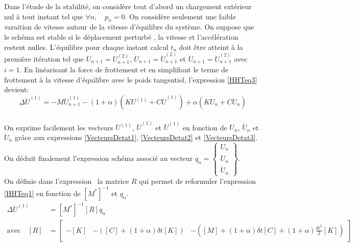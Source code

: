 \documentclass[11pt, a4paper]{article}
\begin{document}
Dans l'étude de la stabilité, on considère tout d'abord un chargement extérieur nul à tout instant tel que $\forall n, \quad p_n = {0}$. On considère seulement une faible varaition de vitesse autour de la vitesse d'équilibre du système. On suppose que le schéma est stable si le déplacement perturbé , la vitesse et l'accélération restent nulles. L'équilibre pour chaque instant calcul $t_n$ doit être atteint à la première itération tel que $U_{n+1} = U_{n+1}^{(2)}$, $\dot{U}_{n+1} = \dot{U}_{n+1}^{(2)}$ et $\ddot{U}_{n+1} = \ddot{U}_{n+1}^{(2)}$ avec $i=1$. En linéarisant la force de frottement et en simplifiant le terme de frottement à la vitesse d'équilibre avec le poids tangentiel, l'expression \ref{HHTeq3} devient:
$$ \Delta \ddot{U}^{(1)} = - M \ddot{U}_{n+1}^{(1)} -(1+\alpha) \left( K U^{(1)} + C \dot{U}^{(1)} \right) + \alpha \left( K U_{n} + C \dot{U}_{n} \right) $$
\\ On exprime facilement les vecteurs $U^{(1)}$, $\dot{U}^{(1)}$ et $\ddot{U}^{(1)}$ en fonction de $U_n$, $\dot{U}_n$ et $\ddot{U}_n$ grâce aux expressions \ref{VecteursDetat1}, \ref{VecteursDetat2} et \ref{VecteursDetat3}.
\\ On déduit finalement l'expression schéma associé au vecteur $q_n = \begin{Bmatrix} U_n \\ \dot{U}_n \\ \ddot{U}_n \end{Bmatrix}$. 
\\ On définie dans l'expression \ la matrice $R$ qui permet de reformuler l'expression \ref{HHTeq1} en fonction de $[M^*]^{-1}$ et $q_n$. 
\begin{align*}
	\Delta \ddot{U}^{(1)} &= [M^*]^{-1} [R] q_n \\
	\text{avec} \quad [R] &= \begin{bmatrix} -[K] & - \left( [C] + (1+\alpha)\delta t [K] \right) & -\left( [M] + (1+\alpha) \delta t [C] + (1+\alpha) \frac{\delta t^2}{2} [K]  \right) \end{bmatrix}
\end{align*}
\\
\end{document}
